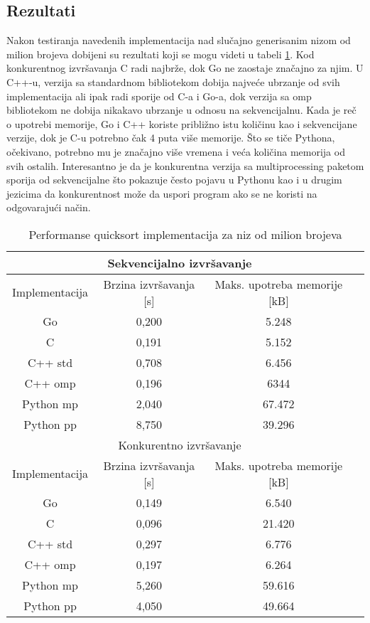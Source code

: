 \documentclass[12pt,oneside]{memoir}
\begin{document}
\subsection{Rezultati}
Nakon testiranja navedenih implementacija nad slučajno generisanim nizom od milion brojeva dobijeni su rezultati koji se mogu videti u tabeli \ref{tab:qs1}.  Kod konkurentnog izvršavanja C radi najbrže, dok Go ne zaostaje značajno za njim. U C++-u, verzija sa standardnom bibliotekom dobija najveće ubrzanje od svih implementacija ali ipak radi sporije od C-a i Go-a, dok verzija sa omp bibliotekom ne dobija nikakavo ubrzanje u odnosu na sekvencijalnu. Kada je reč o upotrebi memorije,  Go i C++ koriste približno istu količinu kao i sekvencijane verzije, dok je C-u potrebno čak 4 puta više memorije. Što se tiče Pythona, očekivano, potrebno mu je značajno više vremena i veća količina memorija od svih ostalih. Interesantno je da je konkurentna verzija sa multiprocessing paketom sporija od sekvencijalne što pokazuje često pojavu u Pythonu kao i u drugim jezicima da konkurentnost može da uspori program ako se ne koristi na odgovarajući način. 

\begin{table}
\begin{center}
\caption{Performanse quicksort implementacija za niz od milion brojeva}
\begin{tabular}{|c|c|c|c|}
\hline
\multicolumn{3}{|c|}{Sekvencijalno izvršavanje} \\ \hline
Implementacija &  Brzina izvršavanja [s] & Maks. upotreba memorije [kB]\\ \hline
Go	 	& 0,200 	&  5.248  \\ \hline
C 		& 0,191 	&  5.152\\ \hline
C++  std 	& 0,708 	&  6.456\\ \hline
C++  omp 	& 0,196  	&  6344  \\ \hline
Python mp  	& 2,040	&  67.472\\ \hline
Python pp  	& 8,750 	&  39.296\\ \hline
\multicolumn{3}{|c|}{Konkurentno izvršavanje} \\ \hline
Implementacija &  Brzina izvršavanja [s]& Maks. upotreba memorije [kB]\\ \hline
Go  		&  0,149	&  6.540\\ \hline
C 		&  0,096	&  21.420\\ \hline
C++  std 	&  0,297 	&  6.776\\ \hline
C++  omp 	&  0,197 	&  6.264\\ \hline
Python mp 	&  5,260 	&  59.616\\ \hline
Python pp  	&  4,050	& 49.664\\ \hline
\end{tabular}
\label{tab:qs1}
\end{center}
\end{table}
\end{document}
